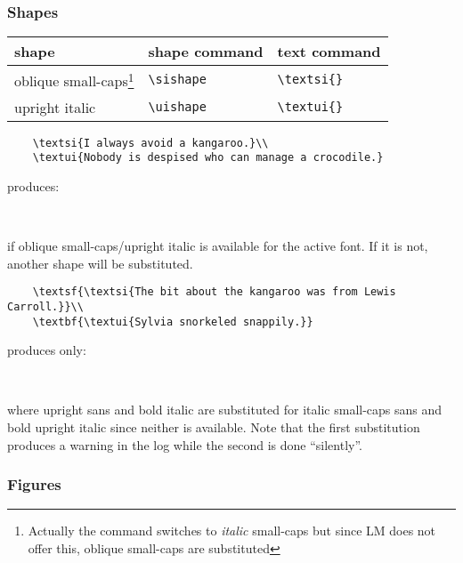 \documentclass[11pt,british]{article}
\begin{document}
\subsubsection{Shapes}

	\begin{longtable}{lll}
		\toprule
		\textbf{shape}		&	\textbf{shape command}	&	\textbf{text command}\\\midrule\endhead
		\bottomrule\endfoot
		oblique small-caps\footnote{Actually the command switches to \emph{italic} small-caps but since LM does not offer this, oblique small-caps are substituted}%
											&	\verb|\sishape|					&	\verb|\textsi{}|\\
		upright italic			&	\verb|\uishape|					&	\verb|\textui{}|\\		
	\end{longtable}
		
\begin{verbatim}
	\textsi{I always avoid a kangaroo.}\\
	\textui{Nobody is despised who can manage a crocodile.}
\end{verbatim}
produces:
\begin{center}
	\\
\end{center}
if oblique small-caps/upright italic is available for the active font. If it is not, another shape will be substituted.
\begin{verbatim}
	\textsf{\textsi{The bit about the kangaroo was from Lewis Carroll.}}\\
	\textbf{\textui{Sylvia snorkeled snappily.}}
\end{verbatim}
produces only:
\begin{center}
	\textsf{}\\
	\textbf{}
\end{center}
where upright sans and bold italic are substituted for italic small-caps sans and bold upright italic since neither is available. Note that the first substitution produces a warning in the log while the second is done ``silently''.
		
\subsubsection{Figures}
\end{document}

